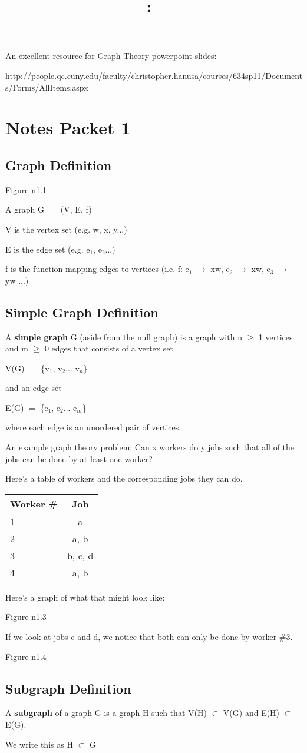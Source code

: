 \documentclass{article}
\title{
    \vspace{2in}
    \textmd{\textbf{\hmwkClass:\ \hmwkTitle}}\\
    \normalsize\vspace{0.1in}\small\vspace{0.1in}\large{\textit{\hmwkClassInstructor}}
    \vspace{3in}
}
\author{\hmwkAuthorName}
\date{}
\newcommand{\mt}[1]{\ensuremath{#1}}
\newcommand\bsc[2][\DefaultOpt]{%
  \def\DefaultOpt{#2}%
  \section[#1]{#2}%
}
\newcommand\ssc[2][\DefaultOpt]{%
  \def\DefaultOpt{#2}%
  \subsection[#1]{#2}%
}
\newcommand{\sbs}{\mt{\subset} }         %
\newcommand{\lra}{ \mt{\longrightarrow} } %
\newcommand{\bk}[1]{\{#1\}}
\newcommand{\gre}{\mt{\operatorname{\geq}} }
\newcommand{\eql}{ \mt{\operatorname{=}} }
\newcommand{\uw}[2]{#1\mt{_{#2}}}
\begin{document}
An excellent resource for Graph Theory powerpoint slides:

http://people.qc.cuny.edu/faculty/christopher.hanusa/courses/634sp11/Documents/Forms/AllItems.aspx

\bsc{Notes Packet 1}{

\ssc{Graph Definition} {
Figure n1.1

A graph G \eql (V, E, f)

V is the vertex set (e.g. w, x, y...)

E is the edge set (e.g. \uw{e}{1}, \uw{e}{2}...)

f is the function mapping edges to vertices (i.e. f: \uw{e}{1} \lra xw, \uw{e}{2} \lra xw, \uw{e}{3} \lra yw ...)
}
\ssc{Simple Graph Definition}{
A \textbf{simple graph} G (aside from the null graph) is a graph with n \gre 1 vertices and m \gre 0 edges that consists of a vertex set

V(G) \eql \bk{\uw{v}{1}, \uw{v}{2}... \uw{v}{n}}

and an edge set

E(G) \eql \bk{\uw{e}{1}, \uw{e}{2}... \uw{e}{m}}

where each edge is an unordered pair of vertices.
}

An example graph theory problem: Can x workers do y jobs such that all of the jobs can be done by at least one worker?

Here's a table of workers and the corresponding jobs they can do.

\begin{tabular}{l|c}
  Worker \# & Job \\
  \hline
  1 & a\\
  2 & a, b\\
  3 & b, c, d\\
  4 & a, b
\end{tabular}

Here's a graph of what that might look like:

Figure n1.3

If we look at jobs c and d, we notice that both can only be done by worker \#3.

Figure n1.4

\ssc{Subgraph Definition}{

A \textbf{subgraph} of a graph G is a graph H such that V(H) \sbs V(G) and E(H) \sbs E(G).

We write this as H \sbs G
}
}
\end{document}
